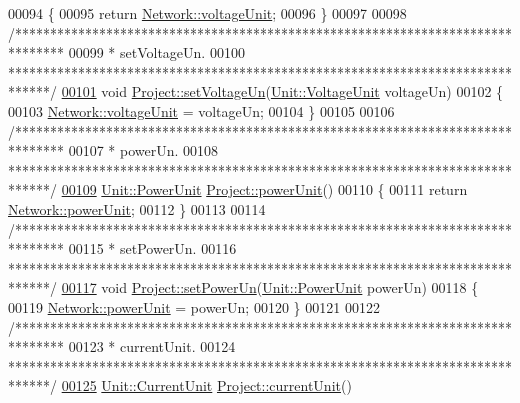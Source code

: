 \begin{DoxyCode}
00094 \{
00095   \textcolor{keywordflow}{return} \hyperlink{group___models_gacde031ef95f5c05565ee35769f2ed89e}{Network::voltageUnit};
00096 \}
00097 
00098 \textcolor{comment}{/*******************************************************************************}
00099 \textcolor{comment}{ * setVoltageUn.}
00100 \textcolor{comment}{ ******************************************************************************/}
\hypertarget{project_8cpp_source_l00101}{}\hyperlink{class_project_aa26b488b2e93c8a8c6b4423ce07df4a1}{00101} \textcolor{keywordtype}{void} \hyperlink{class_project_aa26b488b2e93c8a8c6b4423ce07df4a1}{Project::setVoltageUn}(\hyperlink{class_unit_a55b07dfa9457e1eca2c7194fe0cfc3c1}{Unit::VoltageUnit} voltageUn)
00102 \{
00103   \hyperlink{group___models_gacde031ef95f5c05565ee35769f2ed89e}{Network::voltageUnit} = voltageUn;
00104 \}
00105 
00106 \textcolor{comment}{/*******************************************************************************}
00107 \textcolor{comment}{ * powerUn.}
00108 \textcolor{comment}{ ******************************************************************************/}
\hypertarget{project_8cpp_source_l00109}{}\hyperlink{class_project_a2a1bc35358d6189695d6e5b7dd547ffd}{00109} \hyperlink{class_unit_ace265ae255370ccacfd5370337572c3b}{Unit::PowerUnit} \hyperlink{class_project_a2a1bc35358d6189695d6e5b7dd547ffd}{Project::powerUnit}()
00110 \{
00111   \textcolor{keywordflow}{return} \hyperlink{group___models_ga9504015bc566f4a3d3b4d4a86000293b}{Network::powerUnit};
00112 \}
00113 
00114 \textcolor{comment}{/*******************************************************************************}
00115 \textcolor{comment}{ * setPowerUn.}
00116 \textcolor{comment}{ ******************************************************************************/}
\hypertarget{project_8cpp_source_l00117}{}\hyperlink{class_project_aa46b8645d2047c1a2e8d329b9ebbc120}{00117} \textcolor{keywordtype}{void} \hyperlink{class_project_aa46b8645d2047c1a2e8d329b9ebbc120}{Project::setPowerUn}(\hyperlink{class_unit_ace265ae255370ccacfd5370337572c3b}{Unit::PowerUnit} powerUn)
00118 \{
00119   \hyperlink{group___models_ga9504015bc566f4a3d3b4d4a86000293b}{Network::powerUnit} = powerUn;
00120 \}
00121 
00122 \textcolor{comment}{/*******************************************************************************}
00123 \textcolor{comment}{ * currentUnit.}
00124 \textcolor{comment}{ ******************************************************************************/}
\hypertarget{project_8cpp_source_l00125}{}\hyperlink{class_project_a0d22341fcc068be743b776df0a02f55e}{00125} \hyperlink{class_unit_a0794cf6c9682f48296dd4a5315389787}{Unit::CurrentUnit} \hyperlink{class_project_a0d22341fcc068be743b776df0a02f55e}{Project::currentUnit}()

\end{DoxyCode}
